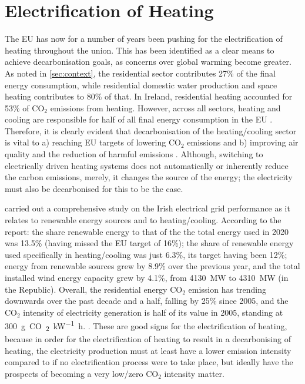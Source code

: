 \section{Electrification of Heating}
The EU has now for a number of years been pushing for the electrification of heating throughout the union. This has been identified as a clear means to achieve decarbonisation goals, as concerns over global warming become greater. As noted in \cref{sec:context}, the residential sector contributes 27\% of the final energy consumption, while residential domestic water production and space heating contributes to 80\% of that. In Ireland, residential heating accounted for 53\% of $\text{CO}_2$ emissions from heating. However, across all sectors, heating and cooling are responsible for half of all final energy consumption in the EU \cite{an2016strategy}. Therefore, it is clearly evident that decarbonisation of the heating/cooling sector is vital to a) reaching EU targets of lowering $\text{CO}_2$ emissions and b) improving air quality and the reduction of harmful emissions \cite{epri2018us}. Although, switching to electrically driven heating systems does not automatically or inherently reduce the carbon emissions, merely, it changes the source of the energy; the electricity must also be decarbonised for this to be the case. 

\citeauthor{seai_energy_2021} \cite{seai_energy_2021} carried out a comprehensive study on the Irish electrical grid performance as it relates to renewable energy sources and to heating/cooling. According to the report: the share renewable energy to that of the the total energy used in 2020 was 13.5\% (having missed the EU target of 16\%); the share of renewable energy used specifically in heating/cooling was just 6.3\%, its target having been 12\%; energy from renewable sources grew by 8.9\% over the previous year, and the total installed wind energy capacity grew by 4.1\%, from \SI{4130}{\mega\watt} to \SI{4310}{\mega\watt} (in the Republic). Overall, the residential energy $\text{CO}_2$ emission has trending downwards over the past decade and a half, falling by 25\% since 2005, and the $\text{CO}_2$ intensity of electricity generation is half of its value in 2005, standing at \SI{300}{\gram CO\textsubscript{2}\per\kilo\watt\hour}. . These are good signs for the electrification of heating, because in order for the electrification of heating to result in a decarbonising of heating, the electricity production must at least have a lower emission intensity compared to if no electrification process were to take place, but ideally have the prospects of becoming a very low/zero $\text{CO}_2$ intensity matter.

